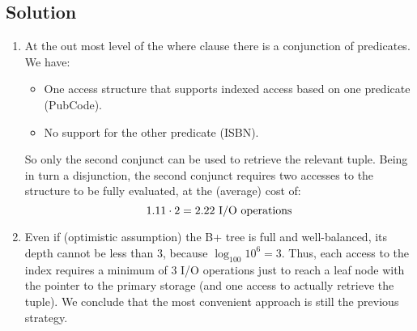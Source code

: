 \subsection*{Solution}
\begin{enumerate}
    \item At the out most level of the where clause there is a conjunction of predicates.
        We have: 
        \begin{itemize}
            \item One access structure that supports indexed access based on one predicate (PubCode). 
            \item No support for the other predicate (ISBN). 
        \end{itemize}
        So only the second conjunct can be used to retrieve the relevant tuple.
        Being in turn a disjunction, the second conjunct requires two accesses to the structure to be fully evaluated, at the (average) cost of: 
        \[1.11 \cdot 2 = 2.22 \textnormal{ I/O operations}\]
    \item Even if (optimistic assumption) the B+ tree is full and well-balanced, its depth cannot be less than 3, because $\log_{100}10^6=3$. 
        Thus, each access to the index requires a minimum of 3 I/O operations just to reach a leaf node with the pointer to the primary storage (and one access to actually retrieve the tuple). 
        We conclude that the most convenient approach is still the previous strategy.
\end{enumerate}